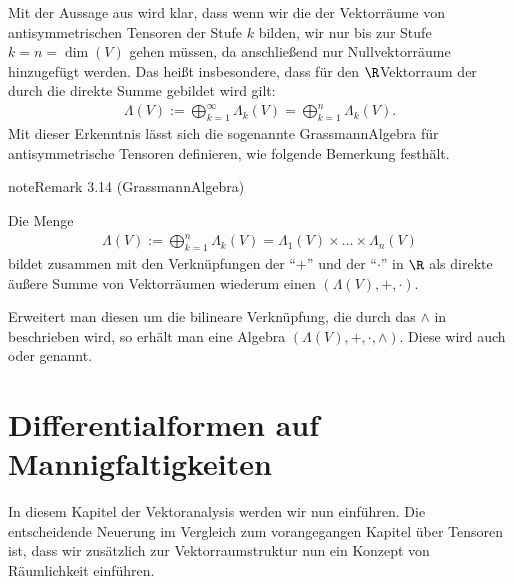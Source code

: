 \documentclass[letterpaper,10pt,english]{jupyterBook}
\begin{document}
\sphinxAtStartPar
Mit der Aussage aus {\hyperref[\detokenize{vektoranalysis/tensor:lem:tensorStufe}]{}} wird klar, dass wenn wir die  der Vektorräume von antisymmetrischen Tensoren der Stufe \(k\) bilden, wir nur bis zur Stufe \(k = n = \operatorname{dim}(V)\) gehen müssen, da anschließend nur Nullvektorräume hinzugefügt werden.
Das heißt insbesondere, dass für den \(\R\)\sphinxhyphen{}Vektorraum der durch die direkte Summe gebildet wird gilt:
\begin{equation*}
\begin{split}\Lambda(V) := \bigoplus_{k=1}^\infty \Lambda_k(V) = \bigoplus_{k=1}^n \Lambda_k(V).\end{split}
\end{equation*}
\sphinxAtStartPar
Mit dieser Erkenntnis lässt sich die sogenannte Grassmann\sphinxhyphen{}Algebra für antisymmetrische Tensoren definieren, wie folgende Bemerkung festhält.
\label{vektoranalysis/tensor:remark-39}
\begin{sphinxadmonition}{note}{Remark 3.14 (Grassmann\sphinxhyphen{}Algebra)}



\sphinxAtStartPar
Die Menge
\begin{equation*}
\begin{split}\Lambda(V) := \bigoplus_{k=1}^n \Lambda_k(V) = \Lambda_1(V) \times \ldots \times \Lambda_n(V)\end{split}
\end{equation*}
\sphinxAtStartPar
bildet zusammen mit den Verknüpfungen der  “\(+\)” und der  “\(\cdot\)” in \(\R\) als direkte äußere Summe von Vektorräumen wiederum einen  \((\Lambda(V), +, \cdot)\).

\sphinxAtStartPar
Erweitert man diesen um die bilineare Verknüpfung, die durch das  \(\wedge\) in {\hyperref[\detokenize{vektoranalysis/tensor:def:aeusseresProdukt}]{}} beschrieben wird, so erhält man eine Algebra \((\Lambda(V), +, \cdot, \wedge)\).
Diese wird auch  oder  genannt.
\end{sphinxadmonition}


\chapter{Differentialformen auf Mannigfaltigkeiten}
\label{\detokenize{manifolds/manifolds:differentialformen-auf-mannigfaltigkeiten}}\label{\detokenize{manifolds/manifolds::doc}}
\sphinxAtStartPar
In diesem Kapitel der Vektoranalysis werden wir nun  einführen.
Die entscheidende Neuerung im Vergleich zum vorangegangen Kapitel über Tensoren ist, dass wir zusätzlich zur Vektorraumstruktur nun ein Konzept von Räumlichkeit einführen.
\end{document}
